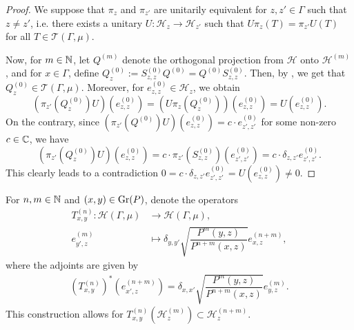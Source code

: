 \documentclass[12pt, class = article, crop = false, a4paper, twoside]{standalone}
\begin{document}
\begin{proof}

    We suppose that $\pi_{z}$ and $\pi_{z'}$ are unitarily equivalent for $z, z'\in\Gamma$ such that $z\neq z'$, i.e. there exists a unitary $U\colon\mathcal{H}_{z}\to\mathcal{H}_{z'}$ such that $U\pi_{z}(T) = \pi_{z'}U(T)$ for all $T\in\mathcal{T}(\Gamma, \mu)$. 

    Now, for $m\in\mathbb{N}$, let $Q^{(m)}$ denote the orthogonal projection from $\mathcal{H}$ onto $\mathcal{H}^{(m)}$, and for $x\in\Gamma$, define $Q^{(0)}_{z} := S^{(0)}_{z, z}Q^{(0)} = Q^{(0)}S^{(0)}_{z, z}$. Then, by \cite[Proposition 4.4]{DOAD21}, we get that $Q^{(0)}_{z}\in\mathcal{T}(\Gamma, \mu)$. Moreover, for $e^{(0)}_{z, z}\in\mathcal{H}_{z}$, we obtain
    \begin{equation*}
        (\pi_{z'}(Q^{(0)}_{z})U)(e^{(0)}_{z, z}) = (U\pi_{z}(Q^{(0)}_{z}))(e^{(0)}_{z, z}) = U(e^{(0)}_{z, z}).
    \end{equation*}
    On the contrary, since $(\pi_{z'}(Q^{(0)})U)(e^{(0)}_{z, z}) = c\cdot e^{(0)}_{z', z'}$ for some non-zero $c\in\mathbb{C}$, we have
    \begin{equation*}
        (\pi_{z'}(Q^{(0)}_{z})U)(e^{(0)}_{z, z}) = c\cdot\pi_{z'}(S^{(0)}_{z, z})(e^{(0)}_{z', z'}) = c\cdot \delta_{z, z'}e^{(0)}_{z', z'}.
    \end{equation*}
    This clearly leads to a contradiction $0 = c\cdot \delta_{z, z'}e^{(0)}_{z', z'} = U(e^{(0)}_{z, z}) \neq 0$.
\end{proof}

\begin{notation}

    For $n, m\in\mathbb{N}$ and $(x, y)\in\operatorname{Gr}(P)$, denote the operators
    \begin{equation*}
        \begin{split}
            T^{(n)}_{x, y}\colon \mathcal{H}(\Gamma, \mu) & \to \mathcal{H}(\Gamma, \mu), \\
            e^{(m)}_{y', z} & \mapsto \delta_{y, y'}\sqrt{\dfrac{P^{m}(y, z)}{P^{n + m}(x, z)}}e^{(n + m)}_{x, z},
        \end{split}
    \end{equation*}
    where the adjoints are given by
    \begin{equation*}
        \begin{split}
            (T^{(n)}_{x, y})^{\ast}(e^{(n + m)}_{x', z}) = \delta_{x, x'}\sqrt{\dfrac{P^{m}(y, z)}{P^{n + m}(x, z)}}e^{(m)}_{y, z}.
        \end{split}
    \end{equation*}
    This construction allows for $T^{(n)}_{x, y}(\mathcal{H}^{(m)}_{z})\subset \mathcal{H}^{(n + m)}_{z}$.
\end{notation}
\end{document}
